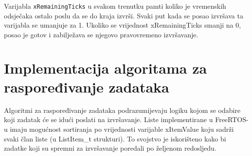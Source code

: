 \documentclass[../zavrsni.tex]{subfiles}
\begin{document}
Varijabla \texttt{xRemainingTicks} u svakom trenutku pamti koliko je vremenskih odsječaka ostalo poslu da se do kraja izvrši. 
Svaki put kada se posao izvršava ta varijabla se umanjuje za 1. Ukoliko se vrijednost xRemainingTicks smanji na 0, 
posao je gotov i zabilježava se njegovo pravovremeno izvršavanje.

\section{Implementacija algoritama za raspoređivanje zadataka}

Algoritmi za raspoređivanje zadataka podrazumijevaju logiku kojom se odabire koji zadatak će se idući poslati na izvršavanje.
Liste implementirane u FreeRTOS-u imaju mogućnost sortiranja po vrijednosti varijable xItemValue koju sadrži svaki član liste 
(u ListItem\_t strukturi). To svojstvo je iskorišteno kako bi zadatke koji su spremni za izvršavanje poredali po željenom redosljedu.
\end{document}
